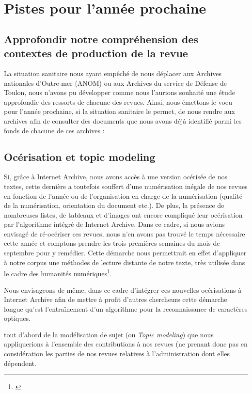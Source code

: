 \chapter{Pistes pour l'année prochaine}

\section{Approfondir notre compréhension des contextes de production de la revue}

La situation sanitaire nous ayant empêché de nous déplacer aux Archives nationales d'Outre-mer (ANOM) ou aux Archives du service de Défense de Toulon, nous n'avons pu développer comme nous l'aurions souhaité une étude approfondie des ressorts de chacune des revues. Ainsi, nous émettons le voeu pour l'année prochaine, si la situation sanitaire le permet, de nous rendre aux archives afin de consulter des documents que nous avons déjà identifié parmi les fonds de chacune de ces archives : 

\section{Océrisation et topic modeling}
Si, grâce à Internet Archive, nous avons accès à une version océrisée de nos textes, cette dernière a toutefois souffert d'une numérisation inégale de nos revues en fonction de l'année ou de l'organisation en charge de la numérisation (qualité de la numérisation, orientation du document etc.). De plus, la présence de nombreuses listes, de tableaux et d'images ont encore compliqué leur océrisation par l'algorithme intégré de Internet Archive. Dans ce cadre, si nous avions envisagé de ré-océriser ces revues, nous n'en avons pas trouvé le temps nécessaire cette année et comptons prendre les trois premières semaines du mois de septembre pour y remédier. Cette démarche nous permettrait en effet d'appliquer à notre corpus une  méthodes de lecture distante de notre texte, très utilisée dans le cadre des humanités numériques\footnote{\cite{yang_topic_2011,callaway_push_2020,broadwell_reading_nodate,dawar_comparing_2019}}. 

Nous envisageons de même, dans ce cadre d'intégrer ces nouvelles océrisations à Internet Archive afin de mettre à profit d'autres chercheurs cette démarche longue qu'est l'entraînement d'un algorithme pour la reconnaissance de caractères optiques.

tout d'abord de la modélisation de sujet (ou \textit{Topic modeling}) que nous appliquerions à l'ensemble des contributions à nos revues (ne prenant donc pas en considération les parties de nos revues relatives à l'administration dont elles dépendent. 


